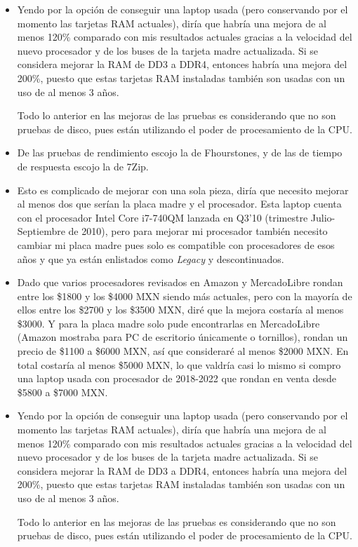 \documentclass[12pt]{article}
\begin{document}
\begin{enumerate}[label=(\arabic{section}.\arabic{subsection}.\arabic{enumi})]
\begin{itemize}
        \item Yendo por la opción de conseguir una laptop usada (pero conservando por el momento las tarjetas RAM actuales), diría que habría una mejora de al menos 120\% comparado con mis resultados actuales gracias a la velocidad del nuevo procesador y de los buses de la tarjeta madre actualizada. Si se considera mejorar la RAM de DD3 a DDR4, entonces habría una mejora del 200\%, puesto que estas tarjetas RAM instaladas también son usadas con un uso de al menos 3 años.\par
        Todo lo anterior en las mejoras de las pruebas es considerando que no son pruebas de disco, pues están utilizando el poder de procesamiento de la CPU.
    \end{itemize}

    \begin{itemize}
        \item De las pruebas de rendimiento escojo la de Fhourstones, y de las de tiempo de respuesta escojo la de 7Zip.

        \item Esto es complicado de mejorar con una sola pieza, diría que necesito mejorar al menos dos que serían la placa madre y el procesador. Esta laptop cuenta con el procesador Intel Core i7-740QM lanzada en Q3'10 (trimestre Julio-Septiembre de 2010), pero para mejorar mi procesador también necesito cambiar mi placa madre pues solo es compatible con procesadores de esos años y que ya están enlistados como \textit{Legacy} y descontinuados.

        \item Dado que varios procesadores revisados en Amazon y MercadoLibre rondan entre los \$1800 y los \$4000 MXN siendo más actuales, pero con la mayoría de ellos entre los \$2700 y los \$3500 MXN, diré que la mejora costaría al menos \$3000. Y para la placa madre solo pude encontrarlas en MercadoLibre (Amazon mostraba para PC de escritorio únicamente o tornillos), rondan un precio de \$1100 a \$6000 MXN, así que consideraré al menos \$2000 MXN. En total costaría al menos \$5000 MXN, lo que valdría casi lo mismo si compro una laptop usada con procesador de 2018-2022 que rondan en venta desde \$5800 a \$7000 MXN.

        \item Yendo por la opción de conseguir una laptop usada (pero conservando por el momento las tarjetas RAM actuales), diría que habría una mejora de al menos 120\% comparado con mis resultados actuales gracias a la velocidad del nuevo procesador y de los buses de la tarjeta madre actualizada. Si se considera mejorar la RAM de DD3 a DDR4, entonces habría una mejora del 200\%, puesto que estas tarjetas RAM instaladas también son usadas con un uso de al menos 3 años.\par
        Todo lo anterior en las mejoras de las pruebas es considerando que no son pruebas de disco, pues están utilizando el poder de procesamiento de la CPU.
    \end{itemize}

\end{enumerate}
\end{document}
